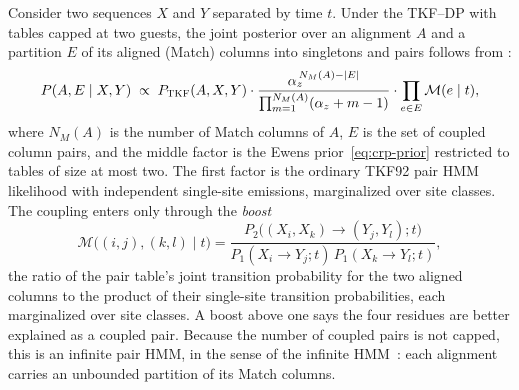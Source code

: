 \documentclass[11pt]{article}
\newcommand{\TKF}{\textsc{TKF}}
\begin{document}
Consider two sequences $X$ and $Y$ separated by time $t$. Under the TKF--DP
with tables capped at two guests, the joint posterior over an alignment $A$
and a partition $E$ of its aligned (Match) columns into singletons and pairs
follows from :
\begin{equation}
\label{eq:iphmm}
P(A,E\mid X,Y)\;\propto\;P_{\TKF}(A,X,Y)\cdot
\frac{\alpha_z^{\,N_M(A)-|E|}}{\prod_{m=1}^{N_M(A)}(\alpha_z+m-1)}\cdot
\prod_{e\in E}\mathcal M(e\mid t),
\end{equation}
where $N_M(A)$ is the number of Match columns of $A$, $E$ is the set of
coupled column pairs, and the middle factor is the Ewens
prior~\eqref{eq:crp-prior} restricted to tables of size at most two. The
first factor is the ordinary TKF92 pair HMM likelihood with independent
single-site emissions, marginalized over site classes. The coupling enters
only through the \emph{boost}
\begin{equation}
\label{eq:boost}
\mathcal M\big((i,j),(k,l)\mid t\big)=
\frac{P_2\big((X_i,X_k)\to(Y_j,Y_l);t\big)}
     {P_1(X_i\to Y_j;t)\,P_1(X_k\to Y_l;t)},
\end{equation}
the ratio of the pair table's joint transition probability for the two
aligned columns to the product of their single-site transition
probabilities, each marginalized over site classes. A boost above one says the
four residues are better explained as a coupled pair. Because the number of
coupled pairs is not capped, this is an infinite pair HMM, in the sense of
the infinite HMM~\citep{Beal2002,TehJordanBealBlei2006}: each alignment
carries an unbounded partition of its Match columns.
\end{document}
